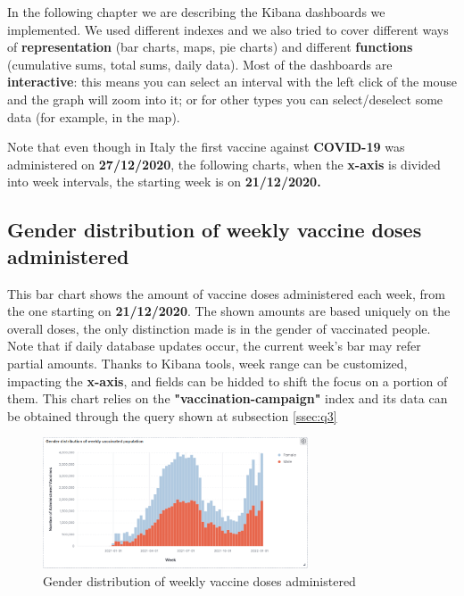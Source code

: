 \documentclass{article}[IEEEtran]
\begin{document}
In the following chapter we are describing the Kibana dashboards we implemented. We used different indexes and we also tried to cover different ways of \textbf{representation} (bar charts, maps, pie charts) and different \textbf{functions} (cumulative sums, total sums, daily data). Most of the dashboards are \textbf{interactive}: this means you can select an interval with the left click of the mouse and the graph will zoom into it; or for other types you can select/deselect some data (for example, in the map).

Note that even though in Italy the first vaccine against \textbf{COVID-19} was administered on \textbf{27/12/2020}, the following charts, when the \textbf{x-axis} is divided into week intervals, the starting week is on \textbf{21/12/2020.}

\subsection{Gender distribution of weekly vaccine doses administered}\label{ssec:dash1}

This bar chart shows the amount of vaccine doses administered each week, from the one starting on \textbf{21/12/2020}.
The shown amounts are based uniquely on the overall doses, the only distinction made is in the gender of vaccinated people. Note that if daily database updates occur, the current week's bar may refer partial amounts. Thanks to Kibana tools, week range can be customized, impacting the \textbf{x-axis}, and fields can be hidded to shift the focus on a portion of them. This chart relies on the \textbf{"vaccination-campaign"} index and its data can be obtained through the query shown at subsection \ref{ssec:q3}

\begin{figure}[H]
\begin{center}
    \includegraphics[width=0.7\textwidth, frame]{Gender distribution of weekly vaccine doses administered.png}
    \caption{Gender distribution of weekly vaccine doses administered}
\end{center}
\end{figure}
\end{document}
